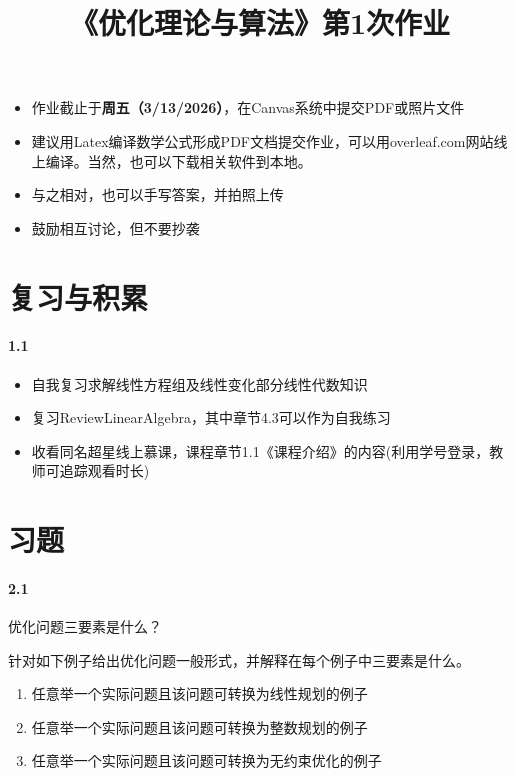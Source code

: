 \documentclass[12pt,a4paper]{article}
\begin{document}
\title{\bf《优化理论与算法》第1次作业}



\maketitle
	\begin{itemize}
		\item 作业截止于{\bf 周五（3/13/2026）}，在Canvas系统中提交PDF或照片文件
		\item 建议用Latex编译数学公式形成PDF文档提交作业，可以用overleaf.com网站线上编译。当然，也可以下载相关软件到本地。
		\item 与之相对，也可以手写答案，并拍照上传
		\item 鼓励相互讨论，但不要抄袭
	\end{itemize}
	
\section{复习与积累}
	\paragraph{1.1}
	\begin{itemize}
		\item 自我复习求解线性方程组及线性变化部分线性代数知识
		\item 复习ReviewLinearAlgebra，其中章节4.3可以作为自我练习
		\item 收看同名超星线上慕课，课程章节1.1《课程介绍》的内容(利用学号登录，教师可追踪观看时长)
	\end{itemize}
	
	
\section{习题}
	
	\paragraph{2.1}
	优化问题三要素是什么？
	
	针对如下例子给出优化问题一般形式，并解释在每个例子中三要素是什么。
	\begin{enumerate}
		\item 任意举一个实际问题且该问题可转换为线性规划的例子
		\item 任意举一个实际问题且该问题可转换为整数规划的例子
		\item 任意举一个实际问题且该问题可转换为无约束优化的例子
	\end{enumerate}
	
\end{document}
